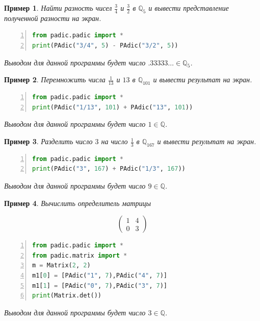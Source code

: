 \documentclass[master, och, diploma, times]{sty/SCWorks}
\theoremstyle{plain}
\newtheorem{exmp}{Пример}[section]
\theoremstyle{definition}
\numberwithin{equation}{section}
\begin{document}
\begin{exmp}
Найти разность чисел $\frac{3}{4}$ и $\frac{3}{2}$ в $\mathbb{Q}_5$ и вывести представление полученной разности на экран.
\begin{lstlisting}[language=Python, numbers=left, showstringspaces=false, breaklines=true, basicstyle=\small]
from padic.padic import *
print(PAdic("3/4", 5) - PAdic("3/2", 5))
\end{lstlisting}

\noindent Выводом для данной программы будет число $.33333\dots \in \mathbb{Q}_5$.
\end{exmp}


\begin{exmp}
Перемножить числа $\frac{1}{13}$ и $13$ в $\mathbb{Q}_{101}$ и вывести результат на экран.
\begin{lstlisting}[language=Python, numbers=left, showstringspaces=false, breaklines=true, basicstyle=\small]
from padic.padic import *
print(PAdic("1/13", 101) + PAdic("13", 101))
\end{lstlisting}

\noindent Выводом для данной программы будет число $1 \in \mathbb{Q}$.
\end{exmp}


\begin{exmp}
Разделить число $3$ на число $\frac{1}{3}$ в $\mathbb{Q}_{167}$ и вывести результат на экран.
\begin{lstlisting}[language=Python, numbers=left, showstringspaces=false, breaklines=true, basicstyle=\small]
from padic.padic import *
print(PAdic("3", 167) + PAdic("1/3", 167))
\end{lstlisting}

\noindent Выводом для данной программы будет число $9 \in \mathbb{Q}$.
\end{exmp}


\begin{exmp}
Вычислить определитель матрицы 

$$
\begin{pmatrix}
  1 & 4 \\
  0 & 3 
\end{pmatrix}
$$

\begin{lstlisting}[language=Python, numbers=left, showstringspaces=false, breaklines=true, basicstyle=\small]
from padic.padic import *
from padic.matrix import *
m = Matrix(2, 2)
m1[0] = [PAdic("1", 7),PAdic("4", 7)]
m1[1] = [PAdic("0", 7),PAdic("3", 7)]
print(Matrix.det())
\end{lstlisting}

\noindent Выводом для данной программы будет число $3 \in \mathbb{Q}$.
\end{exmp}
\end{document}

